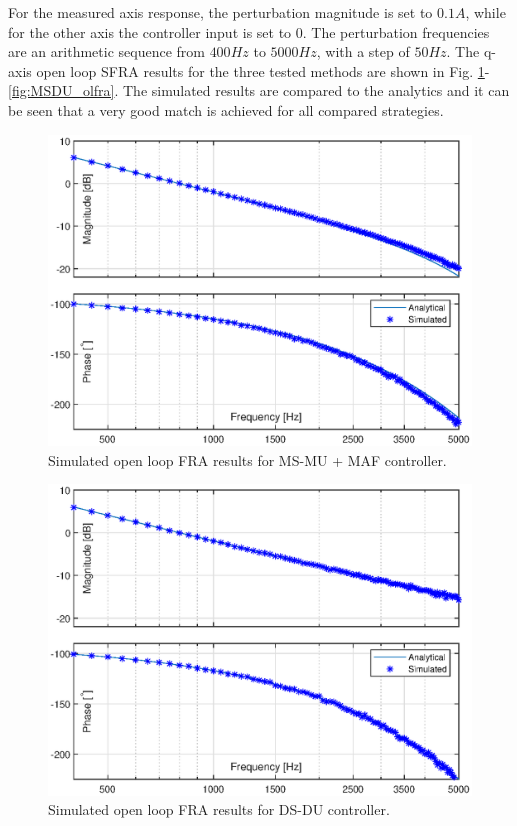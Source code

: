 \documentclass[journal]{IEEEtran}
\begin{document}
For the measured axis response, the perturbation magnitude is set to $0.1 A$, while for the other axis the controller input is set to 0. The perturbation frequencies are an arithmetic sequence from $400 Hz$ to $5000 Hz$, with a step of $50 Hz$. The q-axis open loop SFRA results for the three tested methods are shown in Fig. \ref{fig:MSMUmaf_olfra}-\ref{fig:MSDU_olfra}. The simulated results are compared to the analytics and it can be seen that a very good match is achieved for all compared strategies.

\begin{figure}[t!]
    \centerline{\includegraphics[width=0.95\linewidth]{figures/MSMUmaf_olfra.eps}}
    \caption{Simulated open loop FRA results for MS-MU + MAF controller.}
    \label{fig:MSMUmaf_olfra} 
\end{figure}
\begin{figure}[t!]
    \centerline{\includegraphics[width=0.95\linewidth]{figures/DSDU_olfra.eps}}
    \caption{Simulated open loop FRA results for DS-DU controller.}
    \label{fig:DSDU_olfra} 
\end{figure}
\end{document}
